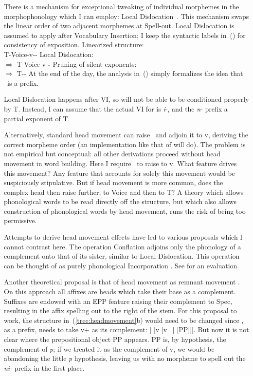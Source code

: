 There is a mechanism for exceptional tweaking of individual morphemes in the morphophonology which I can employ: Local Dislocation~\citep{embicknoyer01}. This mechanism swaps the linear order of two adjacent morphemes at Spell-out. Local Dislocation is assumed to apply after Vocabulary Insertion; I keep the syntactic labels in~(\nextx) for consistency of exposition.
\pex
	\a Linearized structure:\\
		T-Voice-v--\pz
	\a Local Dislocation:\\
		$\Rightarrow$ T-Voice-v-\textbf{\pz-}
	\a Pruning of silent exponents:\\
		$\Rightarrow$ T-\pz-
\xe
At the end of the day, the analysis in~(\lastx) simply formalizes the idea that \pz~is a prefix.

Local Dislocation happens after VI, so {\pz} will not be able to be conditioned properly by T. Instead, I can assume that the actual VI for {\pz} is \emph{i}-, and the \emph{n}- prefix a partial exponent of T.

Alternatively, standard head movement can raise \pz~and adjoin it to v, deriving the correct morpheme order (an implementation like that of \citealt{matushansky06} will do). The problem is not empirical but conceptual: all other derivations proceed without head movement in word building. Here I require \pz~to raise to v. What feature drives this movement? Any feature that accounts for solely this movement would be suspiciously stipulative. But if head movement is more common, does the complex head then raise further, to Voice and then to T? A theory which allows phonological words to be read directly off the structure, but which also allows construction of phonological words by head movement, runs the risk of being too permissive.

Attempts to derive head movement effects have led to various proposals which I cannot contrast here. The operation Conflation \citep{halekeyser02,harley13oup} adjoins only the phonology of a complement onto that of its sister, similar to Local Dislocation. This operation can be thought of as purely phonological Incorporation \citep{baker85,baker88}. See \citet[Ch.~2.5]{rimell12} for an evaluation.

Another theoretical proposal is that of head movement as remnant movement \citep{koopmanszabolcsi00,koopman05,koopman15u20}. On this approach all affixes are heads which take their base as a complement. Suffixes are endowed with an EPP feature raising their complement to Spec, resulting in the affix spelling out to the right of the stem. For this proposal to work, the structure in~(\ref{tree:headmovement}b) would need to be changed since \pz, as a prefix, needs to take v+ as its complement: [{\pz} [v [v ~\!] [PP]]]. But now it is not clear where the prepositional object PP appears. PP is, by hypothesis, the complement of \emph{p}; if we treated it as the complement of v, we would be abandoning the little \emph{p} hypothesis, leaving us with no morpheme to spell out the \emph{ni-} prefix in the first place.

